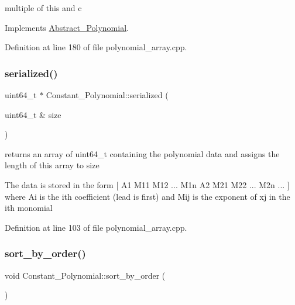 multiple of this and c 

Implements \hyperlink{class_abstract___polynomial_a53b0ed425ff4bbbf01818005d6003d59}{Abstract\+\_\+\+Polynomial}.



Definition at line 180 of file polynomial\+\_\+array.\+cpp.

\mbox{\label{class_constant___polynomial_aafc581313f33e812add8db45cfaa1492}} 
\subsubsection{\texorpdfstring{serialized()}{serialized()}}
{\footnotesize\ttfamily uint64\+\_\+t $\ast$ Constant\+\_\+\+Polynomial\+::serialized (\begin{DoxyParamCaption}\item[{uint64\+\_\+t \&}]{size }\end{DoxyParamCaption})}



returns an array of {\ttfamily uint64\+\_\+t} containing the polynomial data and assigns the length of this array to {\ttfamily size} 

The data is stored in the form \mbox{[} A1 M11 M12 ... M1n A2 M21 M22 ... M2n ... \mbox{]} where Ai is the ith coefficient (lead is first) and Mij is the exponent of xj in the ith monomial 

Definition at line 103 of file polynomial\+\_\+array.\+cpp.

\mbox{\label{class_constant___polynomial_a0cee48bfc1ba32d1ddfd5e78acbf7ba2}} 
\subsubsection{\texorpdfstring{sort\+\_\+by\+\_\+order()}{sort\_by\_order()}}
{\footnotesize\ttfamily void Constant\+\_\+\+Polynomial\+::sort\+\_\+by\+\_\+order (\begin{DoxyParamCaption}{ }\end{DoxyParamCaption})\hspace{0.3cm}{\ttfamily [virtual]}}



